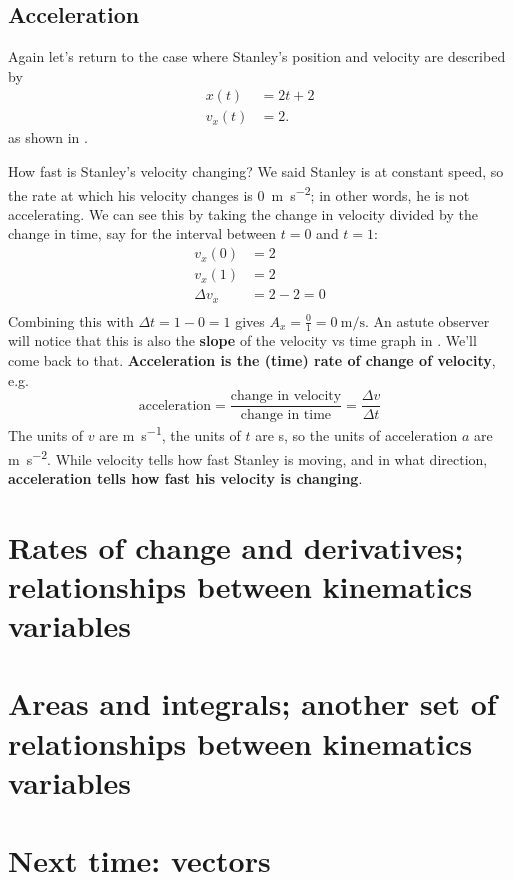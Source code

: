 \documentclass{tufte-handout}
\begin{document}
\subsection{Acceleration}
Again let's return to the case where Stanley's position and velocity are described by
\begin{align}
x(t) &= 2 t + 2 \\
v_x(t) &= 2. 
\end{align}
as shown in .
\begin{marginfigure}
\caption{Stanley's position, velocity, and acceleration}
\label{fig:acceleration1}
\end{marginfigure}
How fast is Stanley's velocity changing? We said Stanley is at constant speed, so the rate at which his velocity changes is \SI{0}{\meter\per\second\squared}; in other words, he is not accelerating. We can see this by taking the change in velocity divided by the change in time, say for the interval between $t=0$ and $t=1$:
\begin{align}
v_x(0) &= 2 \\
v_x(1) &= 2 \\
\Delta v_x &= 2 - 2 = 0\\
\end{align}
Combining this with $\Delta t = 1-0 = 1$ gives $A_x=\frac{0}{1}=\SI{0}{\meter\per\second}$. An astute observer will notice that this is also the \textbf{slope} of the velocity vs time graph in . We'll come back to that.  \textbf{Acceleration is the (time) rate of change of velocity}, e.g.
\begin{equation}
\text{acceleration} = \dfrac{\text{change in velocity}}{\text{change in time}} = \dfrac{\Delta v}{\Delta t}
\end{equation}
The units of $v$ are \si{\meter\per\second}, the units of $t$ are \si{\second}, so the units of acceleration $a$ are \si{\meter\per\second\squared}. While velocity tells how fast Stanley is moving, and in what direction, \textbf{acceleration tells how fast his velocity is changing}. 





\section{Rates of change and derivatives; relationships between kinematics variables}

\section{Areas and integrals; another set of relationships between kinematics variables}

\section{Next time: vectors}


\end{document}
